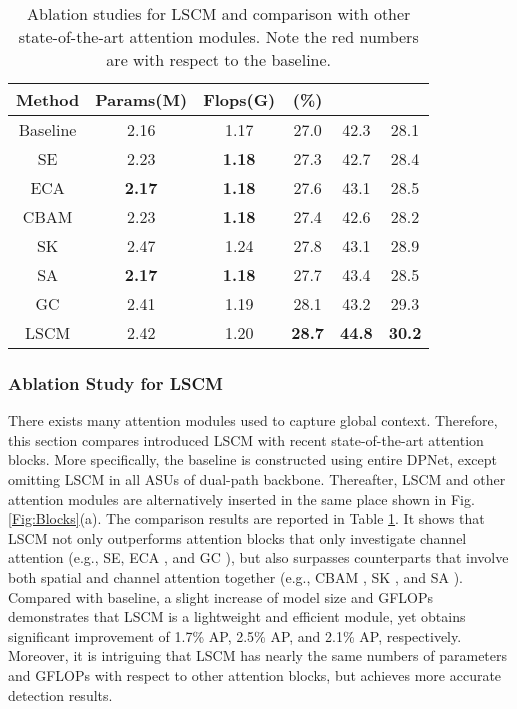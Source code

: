 \documentclass[lettersize,journal]{IEEEtran}
\begin{document}
\begin{table}[t!] 
	\tabcolsep 0.8mm \caption{Ablation studies for LSCM and comparison with other state-of-the-art attention modules. Note the red numbers are with respect to the baseline.}
	\begin{center}
		\begin{tabular}{c|c|c|c|c|c}
			\toprule \multirow{1}{*}{Method} &\multirow{1}{*}{Params(M)}  & \multirow{1}{*}{Flops(G)}& \multirow{1}{*}{(\%)}& \multirow{1}{*}{}& \multirow{1}{*}{}\\ \midrule
Baseline &2.16 &1.17&27.0&42.3&28.1 \\
\midrule
			SE \cite{hu2018squeeze} &2.23 &\textbf{1.18}&27.3&42.7&28.4 \\
			ECA \cite{ecanet} &\textbf{2.17} &\textbf{1.18}& 27.6&43.1& 28.5 \\
CBAM \cite{woo2018cbam} &2.23 &\textbf{1.18}&27.4&42.6&28.2\\
			SK \cite{li2019selective} &2.47 &1.24&27.8&43.1&28.9\\
			SA  \cite{zhang2021sa}    &\textbf{2.17} &\textbf{1.18}&27.7&43.4&  28.5   \\
			GC \cite{cao2019gcnet} &2.41 &1.19&28.1&43.2&29.3 \\
\midrule
			LSCM  &2.42 &1.20 &\textbf{28.7} &\textbf{44.8} &\textbf{30.2}\\
\bottomrule
		\end{tabular}
	\end{center}\label{tab:ASU}
\end{table}

\subsubsection{Ablation Study for LSCM}
There exists many attention modules used to capture global context. Therefore, this section compares introduced LSCM with recent state-of-the-art attention blocks. More specifically, the baseline is constructed using entire DPNet, except omitting LSCM in all ASUs of dual-path backbone. Thereafter, LSCM and other attention modules are alternatively inserted in the same place shown in Fig. \ref{Fig:Blocks}(a). The comparison results are reported in Table \ref{tab:ASU}. It shows that LSCM not only outperforms attention blocks that only investigate channel attention (e.g., SE\cite{hu2018squeeze}, ECA \cite{ecanet}, and GC \cite{cao2019gcnet}), but also surpasses counterparts that involve both spatial and channel attention together (e.g., CBAM \cite{woo2018cbam}, SK \cite{li2019selective}, and SA \cite{zhang2021sa}). Compared with baseline, a slight increase of model size and GFLOPs demonstrates that LSCM is a lightweight and efficient module, yet obtains significant improvement of 1.7\% AP, 2.5\% AP, and 2.1\% AP, respectively. Moreover, it is intriguing that LSCM has nearly the same numbers of parameters and GFLOPs with respect to other attention blocks, but achieves more accurate detection results. 
\end{document}
